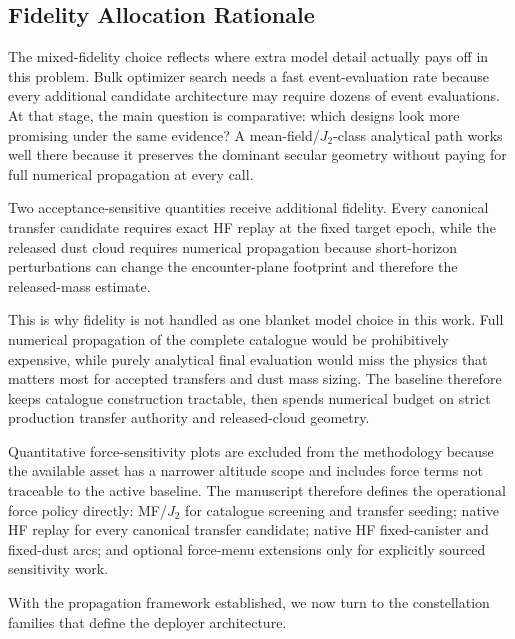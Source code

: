         \subsection{Fidelity Allocation Rationale}
        The mixed-fidelity choice reflects where extra model detail actually pays off in this problem. Bulk optimizer search needs a fast event-evaluation rate because every additional candidate architecture may require dozens of event evaluations. At that stage, the main question is comparative: which designs look more promising under the same evidence? A mean-field/\(J_2\)-class analytical path works well there because it preserves the dominant secular geometry without paying for full numerical propagation at every call.

        Two acceptance-sensitive quantities receive additional fidelity. Every canonical transfer candidate requires exact HF replay at the fixed target epoch, while the released dust cloud requires numerical propagation because short-horizon perturbations can change the encounter-plane footprint and therefore the released-mass estimate.

        This is why fidelity is not handled as one blanket model choice in this work. Full numerical propagation of the complete catalogue would be prohibitively expensive, while purely analytical final evaluation would miss the physics that matters most for accepted transfers and dust mass sizing. The baseline therefore keeps catalogue construction tractable, then spends numerical budget on strict production transfer authority and released-cloud geometry.

        Quantitative force-sensitivity plots are excluded from the methodology because the available asset has a narrower altitude scope and includes force terms not traceable to the active baseline. The manuscript therefore defines the operational force policy directly: MF/\(J_2\) for catalogue screening and transfer seeding; native HF replay for every canonical transfer candidate; native HF fixed-canister and fixed-dust arcs; and optional force-menu extensions only for explicitly sourced sensitivity work.

    \clearpage
    With the propagation framework established, we now turn to the constellation families that define the deployer architecture.


